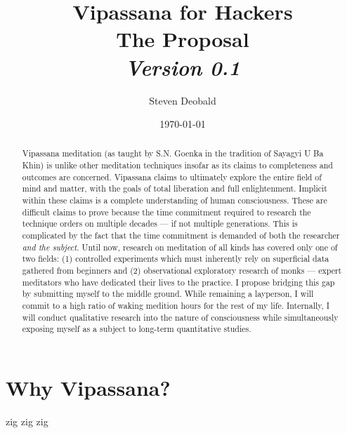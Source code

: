 \documentclass[a4paper, amsfonts, amssymb, amsmath, reprint, showkeys, nofootinbib, twoside]{revtex4-1}
\begin{document}
\title{%
  \large{Vipassana for Hackers} \\
  \Huge{The Proposal} \\
  \large\textit{Version 0.1}
}
\author{Steven Deobald}
\date{\today}

\begin{abstract}
Vipassana meditation (as taught by S.N. Goenka in the tradition of Sayagyi U Ba Khin)
is unlike other meditation techniques insofar as its claims to completeness and
outcomes are concerned. Vipassana claims to ultimately explore the entire field of
mind and matter, with the goals of total liberation and full enlightenment. Implicit
within these claims is a complete understanding of human consciousness. These are
difficult claims to prove because the time commitment required to research the
technique orders on multiple decades --- if not multiple generations. This is complicated by the
fact that the time commitment is demanded of both the researcher \textit{and the
subject}. Until now, research on meditation of all kinds has covered only one of
two fields: (1) controlled experiments which must inherently rely on superficial data
gathered from beginners and (2) observational exploratory research of monks --- expert
meditators who have dedicated their lives to the practice. I propose bridging this
gap by submitting myself to the middle ground. While remaining a layperson, I will
commit to a high ratio of waking medition hours for the rest of my life. Internally,
I will conduct qualitative research into the nature of consciousness while
simultaneously exposing myself as a subject to long-term quantitative studies.


\end{abstract}


\maketitle


\section{Why Vipassana?}

zig zig zig
\end{document}
